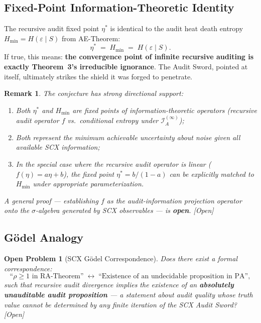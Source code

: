 \documentclass[12pt,a4paper]{article}
\newtheorem{remark}[theorem]{Remark}
\newtheorem{openproblem}[theorem]{Open Problem}
\newcommand{\openquest}{\textcolor{red!70!black}{\small\textsf{[Open]}}}
\newcommand{\cI}{\mathcal{I}}
\begin{document}
\subsection{Fixed-Point Information-Theoretic Identity}

\begin{conjecture}
\label{conj:fixed-point}
The recursive audit fixed point $\eta^*$ is identical to the audit heat death
entropy $H_{\min}=H(\varepsilon\mid S)$ from AE-Theorem:
\begin{equation}\label{eq:fixed-point-identity}
    \eta^* \;=\; H_{\min} \;=\; H(\varepsilon\mid S).
\end{equation}
If true, this means: \textbf{the convergence point of infinite recursive
auditing is exactly Theorem~3's irreducible ignorance}.  The Audit Sword,
pointed at itself, ultimately strikes the shield it was forged to penetrate.
\end{conjecture}

\begin{remark}
The conjecture has strong directional support:
\begin{enumerate}[label=(\roman*)]
    \item Both $\eta^*$ and $H_{\min}$ are fixed points of information-theoretic
          operators (recursive audit operator $f$ vs.\ conditional entropy
          under $\cI_A^{(\infty)}$);
    \item Both represent the \emph{minimum achievable uncertainty} about noise
          given all available SCX information;
    \item In the special case where the recursive audit operator is linear
          ($f(\eta)=a\eta+b$), the fixed point $\eta^*=b/(1-a)$ can be
          explicitly matched to $H_{\min}$ under appropriate parameterization.
\end{enumerate}
A general proof — establishing $f$ as the audit-information projection operator
onto the $\sigma$-algebra generated by SCX observables — is \textbf{open}.
\openquest
\end{remark}

\subsection{G\"odel Analogy}

\begin{openproblem}[SCX G\"odel Correspondence]
\label{prob:godel}
Does there exist a formal correspondence:
\begin{equation}\label{eq:godel-correspondence}
    \text{``$\rho\geq1$ in RA-Theorem''}
    \;\longleftrightarrow\;
    \text{``Existence of an undecidable proposition in PA''},
\end{equation}
such that recursive audit divergence implies the existence of an
\textbf{absolutely unauditable audit proposition} — a statement about audit
quality whose truth value cannot be determined by any finite iteration of the
SCX Audit Sword?  \openquest
\end{openproblem}
\end{document}
